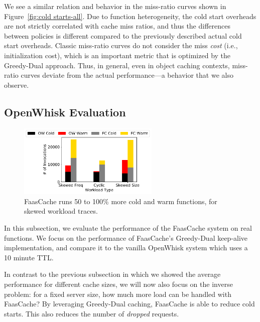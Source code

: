 

We see a similar relation and behavior in the miss-ratio curves shown in Figure~\ref{fig:cold starts-all}. 
Due to function heterogeneity, the cold start overheads are not strictly correlated with cache miss ratios, and thus the differences between policies is different compared to the previously described actual cold start overheads. 
Classic miss-ratio curves do not consider the miss \emph{cost} (i.e., initialization cost), which is an important metric that is optimized by the Greedy-Dual approach.
Thus, in general, even in object caching contexts, miss-ratio curves deviate from the actual performance---a behavior that we also observe. 

\subsection{OpenWhisk Evaluation}
\label{subsec:ow-eval}



\begin{figure}
  \centering
  \includegraphics[width=0.6\textwidth]{faascache/faas-keepalive-20/graphs/litmus_tests/litmus_2_stacked.pdf}
  \caption{FaasCache runs 50 to 100\% more cold and warm functions, for skewed workload traces.}
  \label{fig:litmus_2}  
\end{figure}


In this subsection, we evaluate the performance of the FaasCache system on real functions. 
We focus on the performance of FaasCache's Greedy-Dual keep-alive implementation, and compare it to the vanilla OpenWhisk system which uses a 10 minute TTL.


In contrast to the previous subsection in which we showed the average performance for different cache sizes, we will now also focus on the inverse problem: for a fixed server size, how much more load can be handled with FaasCache? 
By leveraging Greedy-Dual caching, FaasCache is able to reduce cold starts. 
This also reduces the number of \emph{dropped} requests. %

